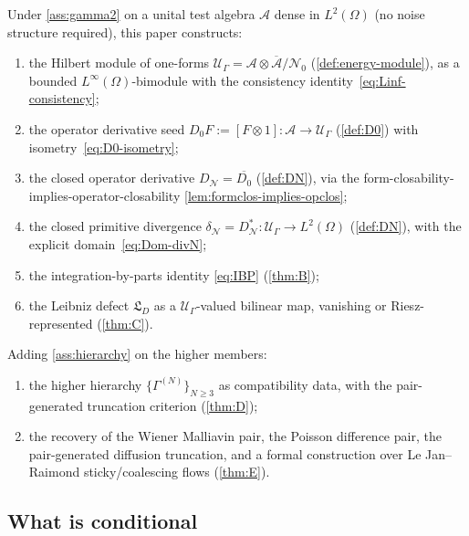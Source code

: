 \documentclass[11pt,reqno]{amsart}
\theoremstyle{plain}
\theoremstyle{definition}
\theoremstyle{remark}
\newcommand{\cA}{\mathcal A}
\newcommand{\cN}{\mathcal N}
\newcommand{\cU}{\mathcal U}
\newcommand{\dN}{D_{\cN}}
\newcommand{\divN}{\delta_{\cN}}
\newcommand{\Lleib}{\mathfrak L}
\begin{document}
Under \cref{ass:gamma2} on a unital test algebra $\cA$ dense in
$L^{2}(\Omega)$ (no noise structure required), this paper
constructs:
\begin{enumerate}
\item[$(\mathrm i)$] the Hilbert module of one-forms
$\cU_{\Gamma}=\overline{\cA\otimes\cA/\mathcal N_{0}}$
(\cref{def:energy-module}), as a bounded
$L^{\infty}(\Omega)$-bimodule with the consistency
identity~\eqref{eq:Linf-consistency};
\item[$(\mathrm{ii})$] the operator derivative seed
$D_{0}F:=[F\otimes 1]\colon\cA\to\cU_{\Gamma}$ (\cref{def:D0})
with isometry~\eqref{eq:D0-isometry};
\item[$(\mathrm{iii})$] the closed operator derivative
$\dN=\overline{D_{0}}$ (\cref{def:DN}), via the
form-closability-implies-operator-closability
\cref{lem:formclos-implies-opclos};
\item[$(\mathrm{iv})$] the closed primitive divergence
$\divN=\dN^{*}\colon\cU_{\Gamma}\to L^{2}(\Omega)$ (\cref{def:DN}),
with the explicit
domain~\eqref{eq:Dom-divN};
\item[$(\mathrm v)$] the integration-by-parts identity
\eqref{eq:IBP} (\cref{thm:B});
\item[$(\mathrm{vi})$] the Leibniz defect $\Lleib_{D}$ as a
$\cU_{\Gamma}$-valued bilinear map, vanishing or
Riesz-represented (\cref{thm:C}).
\end{enumerate}
Adding \cref{ass:hierarchy} on the higher members:
\begin{enumerate}
\item[$(\mathrm{vii})$] the higher hierarchy
$\{\Gamma^{(N)}\}_{N\ge 3}$ as compatibility data, with the
pair-generated truncation criterion (\cref{thm:D});
\item[$(\mathrm{viii})$] the recovery of the Wiener Malliavin
pair, the Poisson difference pair, the pair-generated diffusion
truncation, and a formal construction over Le Jan--Raimond
sticky/coalescing flows (\cref{thm:E}).
\end{enumerate}

\subsection{What is conditional}\label{sec:disc-conditional}
\end{document}

